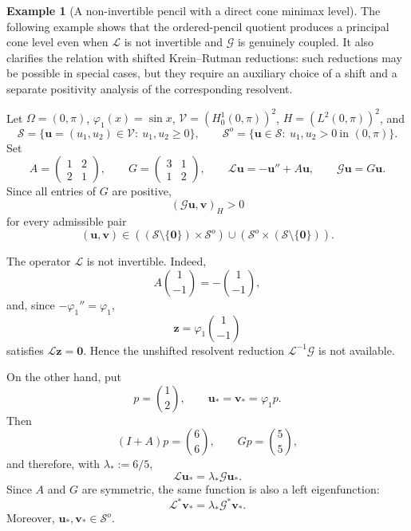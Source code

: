 \documentclass[preprint,10pt]{elsarticle}
\theoremstyle{plain}
\theoremstyle{definition}
\newtheorem{example}{Example}
\theoremstyle{remark}
\begin{document}
\begin{example}[A non-invertible pencil with a direct cone minimax level]
	The following example shows that the ordered-pencil quotient produces a
	principal cone level even when \(\mathcal L\) is not invertible and
	\(\mathcal G\) is genuinely coupled. It also clarifies the relation with
	shifted Krein--Rutman reductions: such reductions may be possible in
	special cases, but they require an auxiliary choice of a shift and a
	separate positivity analysis of the corresponding resolvent.
	
	Let \(\Omega=(0,\pi)\), \(\varphi_1(x)=\sin x\),
	\(\mathcal V=(H_0^1(0,\pi))^2\), \(H=(L^2(0,\pi))^2\), and
	\[
	\mathcal S
	=
	\{\mathbf u=(u_1,u_2)\in\mathcal V:\ u_1,u_2\ge0\},
	\qquad
	\mathcal S^o
	=
	\{\mathbf u\in\mathcal S:\ u_1,u_2>0\ \text{in }(0,\pi)\}.
	\]
	Set
	\[
	A=
	\begin{pmatrix}1&2\\2&1\end{pmatrix},
	\qquad
	G=
	\begin{pmatrix}3&1\\1&2\end{pmatrix},
	\qquad
	\mathcal L\mathbf u=-\mathbf u''+A\mathbf u,
	\qquad
	\mathcal G\mathbf u=G\mathbf u .
	\]
	Since all entries of \(G\) are positive,
	\[
	(\mathcal G\mathbf u,\mathbf v)_H>0
	\]
	for every admissible pair
	\[
	(\mathbf u,\mathbf v)\in
	((\mathcal S\setminus\{\mathbf0\})\times\mathcal S^o)
	\cup
	(\mathcal S^o\times(\mathcal S\setminus\{\mathbf0\})).
	\]
	
	The operator \(\mathcal L\) is not invertible. Indeed,
	\[
	A\binom{1}{-1}=-\binom{1}{-1},
	\]
	and, since \(-\varphi_1''=\varphi_1\),
	\[
	\mathbf z=\varphi_1\binom{1}{-1}
	\]
	satisfies \(\mathcal L\mathbf z=\mathbf0\). Hence the unshifted
	resolvent reduction \(\mathcal L^{-1}\mathcal G\) is not available.
	
	On the other hand, put
	\[
	p=\binom{1}{2},
	\qquad
	\mathbf u_*=\mathbf v_*=\varphi_1 p .
	\]
	Then
	\[
	(I+A)p=\binom{6}{6},
	\qquad
	Gp=\binom{5}{5},
	\]
	and therefore, with \(\lambda_*:=6/5\),
	\[
	\mathcal L\mathbf u_*=\lambda_*\mathcal G\mathbf u_* .
	\]
	Since \(A\) and \(G\) are symmetric, the same function is also a left
	eigenfunction:
	\[
	\mathcal L^*\mathbf v_*=\lambda_*\mathcal G^*\mathbf v_* .
	\]
	Moreover, \(\mathbf u_*,\mathbf v_*\in\mathcal S^o\).
	

\end{example}
\end{document}
